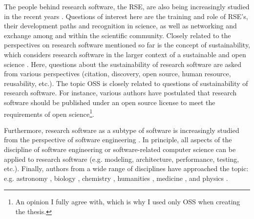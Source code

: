 \documentclass[12pt, a4paper, titlepage, oneside, abstract=true, toc=listof, toc=bibliography, BCOR=1cm]{scrreprt}
\begin{document}
The people behind research software, the \gls{RSE}, are also being increasingly studied in the recent years \citep[e.g.][]{Anzt2020, Baxter2012, Brett2017, Jay2016, Katz2018, Richardson2017}. Questions of interest here are the training and role of RSE's, their development paths and recognition in science, as well as networking and exchange among and within the scientific community. 
Closely related to the perspectives on research software mentioned so far is the concept of sustainability, which considers research software in the larger context of a sustainable and open science \citep[e.g.][]{Imran2019, Badreddin2019, Cohen2018, Souza2019, Fehr2019, Katz2019, Loeffler2019, Lubbock2019, Saputri2020}. Here, questions about the sustainability of research software are asked from various perspectives (citation, discovery, open source, human resource, reusability, etc.).
The topic \gls{OSS} is closely related to questions of sustainability of research software. For instance, various authors \citep[e.g.][]{HerraizTabernero2007, Hong2019, Ince2012, Kislinskiy2016, Oishi2018, Pianosi2019, Tennant2020a} have postulated that research software should be published under an open source license to meet the requirements of open science\footnote{An opinion I fully agree with, which is why I used only OSS when creating the thesis.}.

Furthermore, research software as a subtype of software is increasingly studied from the perspective of software engineering \citep[e.g.][]{Johanson2018, Hasselbring2019a, Hasselbring2020, Kanewala2018, Zirkelbach2020}. In principle, all aspects of the discipline of software engineering or software-related computer science can be applied to research software (e.g. modeling, architecture, performance, testing, etc.).
Finally, authors from a wide range of disciplines have approached the topic: e.g.
astronomy \citep{Allen2019, Borne2009, Gray2011, Grosbol2010, Muna2016, Oishi2018, Shortridge2009, Weiner2009}, 
biology \citep{Lee2018, Mangul2019, Markowetz2017, Waltemath2016},
chemistry \citep{AlvarezMoreno2014, Dryden2017, Goh2017, Grimme2017},
humanities \citep{Anthony2013, Brian2020, Edmond2017, Heyer2019, Wolski2017},
medicine \citep{Kislinskiy2016, White2019, Ye2019},
and physics \citep{Bobra2020, Shamir2013, Zwart2018}.
\end{document}
